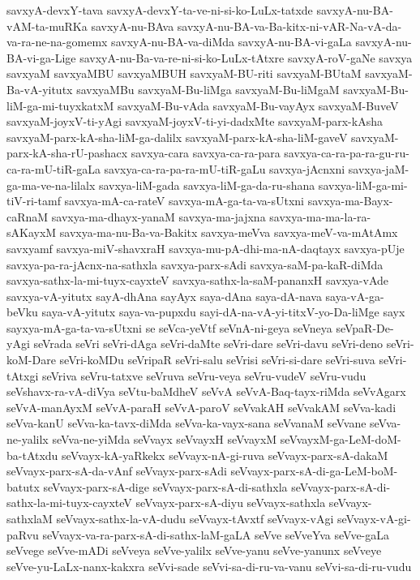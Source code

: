 {savxyA-devxY-tava
savxyA-devxY-ta-ve-ni-si-ko-LuLx-tatxde
savxyA-nu-BA-vAM-ta-muRKa
savxyA-nu-BAva
savxyA-nu-BA-va-Ba-kitx-ni-vAR-Na-vA-da-va-ra-ne-na-gomemx
savxyA-nu-BA-va-diMda
savxyA-nu-BA-vi-gaLa
savxyA-nu-BA-vi-ga-Lige
savxyA-nu-Ba-va-re-ni-si-ko-LuLx-tAtxre
savxyA-roV-gaNe
savxya
savxyaM
savxyaMBU
savxyaMBUH
savxyaM-BU-riti
savxyaM-BUtaM
savxyaM-Ba-vA-yitutx
savxyaMBu
savxyaM-Bu-liMga
savxyaM-Bu-liMgaM
savxyaM-Bu-liM-ga-mi-tuyxkatxM
savxyaM-Bu-vAda
savxyaM-Bu-vayAyx
savxyaM-BuveV
savxyaM-joyxV-ti-yAgi
savxyaM-joyxV-ti-yi-dadxMte
savxyaM-parx-kAsha
savxyaM-parx-kA-sha-liM-ga-dalilx
savxyaM-parx-kA-sha-liM-gaveV
savxyaM-parx-kA-sha-rU-pashacx
savxya-cara
savxya-ca-ra-para
savxya-ca-ra-pa-ra-gu-ru-ca-ra-mU-tiR-gaLa
savxya-ca-ra-pa-ra-mU-tiR-gaLu
savxya-jAcnxni
savxya-jaM-ga-ma-ve-na-lilalx
savxya-liM-gada
savxya-liM-ga-da-ru-shana
savxya-liM-ga-mi-tiV-ri-tamf
savxya-mA-ca-rateV
savxya-mA-ga-ta-va-sUtxni
savxya-ma-Bayx-caRnaM
savxya-ma-dhayx-yanaM
savxya-ma-jajxna
savxya-ma-ma-la-ra-sAKayxM
savxya-ma-nu-Ba-va-Bakitx
savxya-meVva
savxya-meV-va-mAtAmx
savxyamf
savxya-miV-shavxraH
savxya-mu-pA-dhi-ma-nA-daqtayx
savxya-pUje
savxya-pa-ra-jAcnx-na-sathxla
savxya-parx-sAdi
savxya-saM-pa-kaR-diMda
savxya-sathx-la-mi-tuyx-cayxteV
savxya-sathx-la-saM-pananxH
savxya-vAde
savxya-vA-yitutx
sayA-dhAna
sayAyx
saya-dAna
saya-dA-nava
saya-vA-ga-beVku
saya-vA-yitutx
saya-va-pupxdu
sayi-dA-na-vA-yi-titxV-yo-Da-liMge
sayx
sayxya-mA-ga-ta-va-sUtxni
se
seVca-yeVtf
seVnA-ni-geya
seVneya
seVpaR-De-yAgi
seVrada
seVri
seVri-dAga
seVri-daMte
seVri-dare
seVri-davu
seVri-deno
seVri-koM-Dare
seVri-koMDu
seVripaR
seVri-salu
seVrisi
seVri-si-dare
seVri-suva
seVri-tAtxgi
seVriva
seVru-tatxve
seVruva
seVru-veya
seVru-vudeV
seVru-vudu
seVshavx-ra-vA-diVya
seVtu-baMdheV
seVvA
seVvA-Baq-tayx-riMda
seVvAgarx
seVvA-manAyxM
seVvA-paraH
seVvA-paroV
seVvakAH
seVvakAM
seVva-kadi
seVva-kanU
seVva-ka-tavx-diMda
seVva-ka-vayx-sana
seVvanaM
seVvane
seVva-ne-yalilx
seVva-ne-yiMda
seVvayx
seVvayxH
seVvayxM
seVvayxM-ga-LeM-doM-ba-tAtxdu
seVvayx-kA-yaRkekx
seVvayx-nA-gi-ruva
seVvayx-parx-sA-dakaM
seVvayx-parx-sA-da-vAnf
seVvayx-parx-sAdi
seVvayx-parx-sA-di-ga-LeM-boM-batutx
seVvayx-parx-sA-dige
seVvayx-parx-sA-di-sathxla
seVvayx-parx-sA-di-sathx-la-mi-tuyx-cayxteV
seVvayx-parx-sA-diyu
seVvayx-sathxla
seVvayx-sathxlaM
seVvayx-sathx-la-vA-dudu
seVvayx-tAvxtf
seVvayx-vAgi
seVvayx-vA-gi-paRvu
seVvayx-va-ra-parx-sA-di-sathx-laM-gaLA
seVve
seVveYva
seVve-gaLa
seVvege
seVve-mADi
seVveya
seVve-yalilx
seVve-yanu
seVve-yanunx
seVveye
seVve-yu-LaLx-nanx-kakxra
seVvi-sade
seVvi-sa-di-ru-va-vanu
seVvi-sa-di-ru-vudu
}
